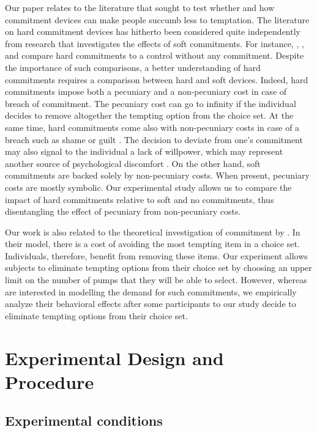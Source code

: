 \documentclass[
]{book}
\begin{document}
Our paper relates to the literature that sought to test whether and how
commitment devices can make people succumb less to temptation.
The literature on hard commitment devices has hitherto been considered quite
independently from research that investigates the effects of soft commitments.
For instance, \citet{trope2000counteractive}, \citet{ariely2002procrastination}, and
\citet{houser2018temptation} compare hard commitments to a control without any
commitment.
Despite the importance of such comparisons, a better understanding of hard
commitments requires a comparison between hard and soft devices.
Indeed, hard commitments impose both a pecuniary and a non-pecuniary cost in
case of breach of commitment.
The pecuniary cost can go to infinity if the individual decides to remove
altogether the tempting option from the choice set.
At the same time, hard commitments come also with non-pecuniary costs in case of
a breach such as shame or guilt \citep{kast2014saving}.
The decision to deviate from one's commitment may also signal to the individual
a lack of willpower, which may represent another source of psychological
discomfort \citep{benabou2004willpower}.
On the other hand, soft commitments are backed solely by non-pecuniary costs.
When present, pecuniary costs are mostly symbolic.
Our experimental study allows us to compare the impact of hard commitments
relative to soft and no commitments, thus disentangling the effect of pecuniary
from non-pecuniary costs.

Our work is also related to the theoretical investigation of commitment by
\citet{gul2001temptation}.
In their model, there is a cost of avoiding the most tempting item in a choice
set.
Individuals, therefore, benefit from removing these items.
Our experiment allows subjects to eliminate tempting options from their choice
set by choosing an upper limit on the number of pumps that they will be able to
select.
However, whereas \citet{gul2001temptation} are interested in modelling the demand for
such commitments, we empirically analyze their behavioral effects after some
participants to our study decide to eliminate tempting options from their choice
set.

\hypertarget{mm2}{%
\section{Experimental Design and Procedure}\label{mm2}}

\hypertarget{experimental-conditions}{%
\subsection{Experimental conditions}\label{experimental-conditions}}
\end{document}
